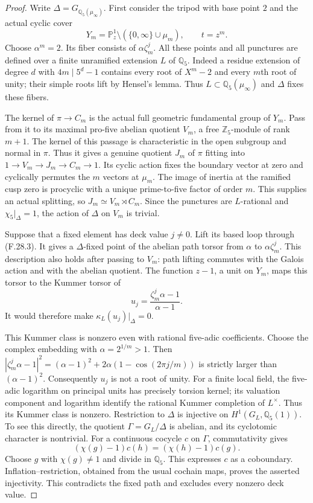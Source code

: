 \begin{proof}
Write $\Delta=G_{\mathbb Q_5(\mu_\infty)}$.
First consider the tripod with base point $2$ and
the actual cyclic cover
\[
 Y_m=\mathbb P^1_z\setminus(\{0,\infty\}\cup\mu_m),
       \qquad t=z^m.                                      \tag{F.28.3}
\]
Choose $\alpha^m=2$.  Its fiber consists of
$\alpha\zeta_m^j$.  All these points and all punctures
are defined over a finite unramified extension $L$
of $\mathbb Q_5$.  Indeed a residue extension of
degree $d$ with $4m\mid5^d-1$ contains every root
of $X^m-2$ and every $m$th root of unity; their
simple roots lift by Hensel's lemma.
Thus $L\subset\mathbb Q_5(\mu_\infty)$ and $\Delta$
fixes these fibers.

The kernel of $\pi\to C_m$ is the actual full
geometric fundamental group of $Y_m$.
Pass from it to its maximal pro-five abelian
quotient $V_m$, a free $\mathbb Z_5$-module of
rank $m+1$.  The kernel of this passage is
characteristic in the open subgroup and normal
in $\pi$.  Thus it gives a genuine quotient
$J_m$ of $\pi$ fitting into
$1\to V_m\to J_m\to C_m\to1$.
Its cyclic action fixes the boundary vector at
zero and cyclically permutes the $m$ vectors
at $\mu_m$.
The image of inertia at the ramified cusp zero
is procyclic with a unique prime-to-five factor
of order $m$.  This supplies an actual splitting,
so $J_m\simeq V_m\rtimes C_m$.
Since the punctures are $L$-rational and
$\chi_5|_\Delta=1$, the action of $\Delta$ on
$V_m$ is trivial.

Suppose that a fixed element has deck value
$j\ne0$.  Lift its based loop through (F.28.3).
It gives a $\Delta$-fixed point of the abelian
path torsor from $\alpha$ to
$\alpha\zeta_m^j$.  This description also
holds after passing to $V_m$: path lifting
commutes with the Galois action and with the
abelian quotient.  The function $z-1$, a unit
on $Y_m$, maps this torsor to the Kummer
torsor of
\[
              u_j=\frac{\zeta_m^j\alpha-1}{\alpha-1}.
                                                               \tag{F.28.4}
\]
It would therefore make
$\kappa_L(u_j)|_\Delta=0$.

This Kummer class is nonzero even with rational
five-adic coefficients.  Choose the complex
embedding with $\alpha=2^{1/m}>1$.
Then
$|\zeta_m^j\alpha-1|^2
=(\alpha-1)^2+2\alpha(1-\cos(2\pi j/m))$
is strictly larger than $(\alpha-1)^2$.
Consequently $u_j$ is not a root of unity.
For a finite local field, the five-adic
logarithm on principal units has precisely
torsion kernel; its valuation component
and logarithm identify the rational Kummer
completion of $L^\times$.
Thus its Kummer class is nonzero.
Restriction to $\Delta$ is injective on
$H^1(G_L,\mathbb Q_5(1))$.
To see this directly, the quotient
$\Gamma=G_L/\Delta$ is abelian, and its
cyclotomic character is nontrivial.
For a continuous cocycle $c$ on $\Gamma$,
commutativity gives
\[
  (\chi(g)-1)c(h)=(\chi(h)-1)c(g).
\]
Choose $g$ with $\chi(g)\ne1$ and divide
in $\mathbb Q_5$.  This expresses $c$ as
a coboundary.  Inflation--restriction,
obtained from the usual cochain maps,
proves the asserted injectivity.
This contradicts the fixed path and
excludes every nonzero deck value.


\end{proof}
